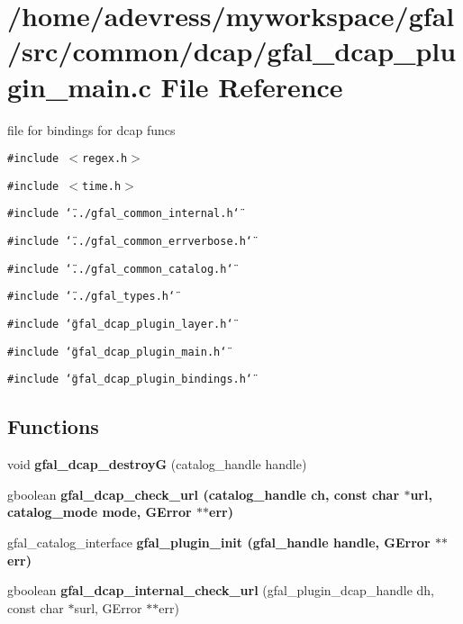 \section{/home/adevress/myworkspace/gfal/src/common/dcap/gfal\_\-dcap\_\-plugin\_\-main.c File Reference}
\label{gfal__dcap__plugin__main_8c}
file for bindings for dcap funcs 

{\tt \#include $<$regex.h$>$}\par
{\tt \#include $<$time.h$>$}\par
{\tt \#include \char`\"{}../gfal\_\-common\_\-internal.h\char`\"{}}\par
{\tt \#include \char`\"{}../gfal\_\-common\_\-errverbose.h\char`\"{}}\par
{\tt \#include \char`\"{}../gfal\_\-common\_\-catalog.h\char`\"{}}\par
{\tt \#include \char`\"{}../gfal\_\-types.h\char`\"{}}\par
{\tt \#include \char`\"{}gfal\_\-dcap\_\-plugin\_\-layer.h\char`\"{}}\par
{\tt \#include \char`\"{}gfal\_\-dcap\_\-plugin\_\-main.h\char`\"{}}\par
{\tt \#include \char`\"{}gfal\_\-dcap\_\-plugin\_\-bindings.h\char`\"{}}\par
\subsection*{Functions}
\begin{CompactItemize}
\item 
void \textbf{gfal\_\-dcap\_\-destroy\-G} (catalog\_\-handle handle)\label{gfal__dcap__plugin__main_8c_3cf3ae23969060c6a7237d026e6b75b1}

\item 
gboolean \bf{gfal\_\-dcap\_\-check\_\-url} (catalog\_\-handle ch, const char $\ast$url, catalog\_\-mode mode, GError $\ast$$\ast$err)
\item 
gfal\_\-catalog\_\-interface \bf{gfal\_\-plugin\_\-init} (gfal\_\-handle handle, GError $\ast$$\ast$err)
\item 
gboolean \textbf{gfal\_\-dcap\_\-internal\_\-check\_\-url} (gfal\_\-plugin\_\-dcap\_\-handle dh, const char $\ast$surl, GError $\ast$$\ast$err)\label{gfal__dcap__plugin__main_8c_73fbacad3f9f3025a24c39f4d1dfad2d}

\end{CompactItemize}


